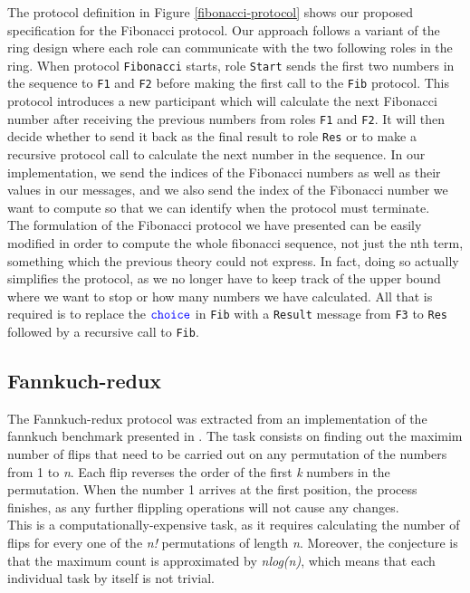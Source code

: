 \documentclass[12pt,twoside]{report}
\begin{document}
The protocol definition in Figure \ref{fibonacci-protocol} shows our proposed specification for the Fibonacci protocol. Our approach follows a variant of the ring design where each role can communicate with the two following roles in the ring. When protocol \texttt{Fibonacci} starts, role \texttt{Start} sends the first two numbers in the sequence to \texttt{F1} and \texttt{F2} before making the first call to the \texttt{Fib} protocol. This protocol introduces a new participant which will calculate the next Fibonacci number after receiving the previous numbers from roles \texttt{F1} and \texttt{F2}. It will then decide whether to send it back as the final result to role \texttt{Res} or to make a recursive protocol call to calculate the next number in the sequence. In our implementation, we send the indices of the Fibonacci numbers as well as their values in our messages, and we also send the index of the Fibonacci number we want to compute so that we can identify when the protocol must terminate.\\

The formulation of the Fibonacci protocol we have presented can be easily modified in order to compute the whole fibonacci sequence, not just the nth term, something which the previous theory could not express. In fact, doing so actually simplifies the protocol, as we no longer have to keep track of the upper bound where we want to stop or how many numbers we have calculated. All that is required is to replace the ${\color{blue}\mathtt{choice}}$ in \texttt{Fib} with a \texttt{Result} message from \texttt{F3} to \texttt{Res} followed by a recursive call to \texttt{Fib}.

\subsection{Fannkuch-redux}\label{fannkuch}

The Fannkuch-redux protocol was extracted from an implementation of the fannkuch benchmark presented in \cite{CLBG}. The task consists on finding out the maximim number of flips that need to be carried out on any permutation of the numbers from 1 to \textit{n}. Each flip reverses the order of the first \textit{k} numbers in the permutation. When the number 1 arrives at the first position, the process finishes, as any further flippling operations will not cause any changes.\\

This is a computationally-expensive task, as it requires calculating the number of flips for every one of the \textit{n!} permutations of length \textit{n}. Moreover, the conjecture is that the maximum count is approximated by \textit{nlog(n)}, which means that each individual task by itself is not trivial.\\
\end{document}
